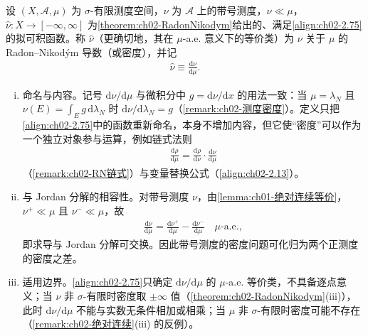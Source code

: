 \documentclass[../../main.tex]{subfiles}%
\begin{document}
\begin{definition}\label{definition:ch02-RadonNikodym导数}
设 $(X,\mathscr A,\mu)$ 为 $\sigma$-有限测度空间，$\nu$ 为 $\mathscr A$ 上的带号测度，$\nu\ll\mu$，$\hat\nu:X\to[-\infty,\infty]$ 为\cref{theorem:ch02-RadonNikodym}给出的、满足\eqref{align:ch02-2.75}的拟可积函数。称 $\hat\nu$（更确切地，其在 $\mu$-a.e. 意义下的等价类）为 $\nu$ 关于 $\mu$ 的 Radon--Nikodým 导数（或密度），并记
\begin{align*}
\hat\nu\equiv\frac{\mathrm{d}\nu}{\mathrm{d}\mu}.
\end{align*}
\end{definition}

\begin{remark}\label{remark:ch02-RadonNikodym导数}
\begin{enumerate}[(i)]
\item 命名与内容。记号 $\mathrm{d}\nu/\mathrm{d}\mu$ 与微积分中 $g=\mathrm{d}\nu/\mathrm{d}x$ 的用法一致：当 $\mu=\lambda_N$ 且 $\nu(E)=\int_Eg\,\mathrm{d}\lambda_N$ 时 $\mathrm{d}\nu/\mathrm{d}\lambda_N=g$（\cref{remark:ch02-测度密度}）。定义只把\eqref{align:ch02-2.75}中的函数重新命名，本身不增加内容，但它使“密度”可以作为一个独立对象参与运算，例如链式法则
\begin{align*}
\frac{\mathrm{d}\rho}{\mathrm{d}\mu}=\frac{\mathrm{d}\rho}{\mathrm{d}\nu}\cdot\frac{\mathrm{d}\nu}{\mathrm{d}\mu}
\end{align*}
（\cref{remark:ch02-RN链式}）与变量替换公式（\eqref{align:ch02-2.13}）。
\item 与 Jordan 分解的相容性。对带号测度 $\nu$，由\cref{lemma:ch01-绝对连续等价}，$\nu^+\ll\mu$ 且 $\nu^-\ll\mu$，故
\begin{align*}
\frac{\mathrm{d}\nu}{\mathrm{d}\mu}=\frac{\mathrm{d}\nu^+}{\mathrm{d}\mu}-\frac{\mathrm{d}\nu^-}{\mathrm{d}\mu}\quad\mu\text{-a.e.},
\end{align*}
即求导与 Jordan 分解可交换。因此带号测度的密度问题可化归为两个正测度的密度之差。
\item 适用边界。\eqref{align:ch02-2.75}只确定 $\mathrm{d}\nu/\mathrm{d}\mu$ 的 $\mu$-a.e. 等价类，不具备逐点意义；当 $\nu$ 非 $\sigma$-有限时密度取 $\pm\infty$ 值（\cref{theorem:ch02-RadonNikodym}(iii)），此时 $\mathrm{d}\nu/\mathrm{d}\mu$ 不能与实数无条件相加或相乘；当 $\mu$ 非 $\sigma$-有限时密度可能不存在（\cref{remark:ch02-绝对连续}(iii) 的反例）。
\end{enumerate}
\end{remark}
\end{document}
